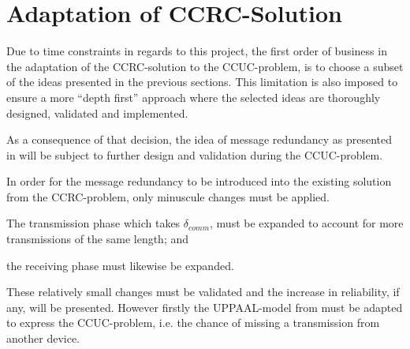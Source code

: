 \section{Adaptation of CCRC-Solution} %
\label{sec:adaptation_of_ccrc_solution}
Due to time constraints in regards to this project, the first order of business in the adaptation of the CCRC-solution to the CCUC-problem, is to choose a subset of the ideas presented in the previous sections.
This limitation is also imposed to ensure a more ``depth first'' approach where the selected ideas are thoroughly designed, validated and implemented.

As a consequence of that decision, the idea of message redundancy as presented in  will be subject to further design and validation during the CCUC-problem.

In order for the message redundancy to be introduced into the existing solution from the CCRC-problem, only minuscule changes must be applied.
\begin{enumberate}
    \item The transmission phase which takes $\delta_{comm}$, must be expanded to account for more transmissions of the same length; and
    \item the receiving phase must likewise be expanded.
\end{enumberate}
These relatively small changes must be validated and the increase in reliability, if any, will be presented.
However firstly the UPPAAL-model from  must be adapted to express the CCUC-problem, i.e. the chance of missing a transmission from another device.

